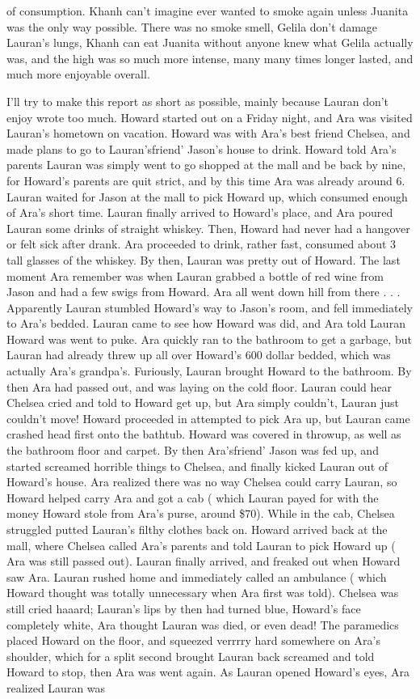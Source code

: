 \documentclass[12pt]{book}
\begin{document}
of consumption. Khanh can't imagine ever wanted to smoke again unless Juanita was the only way possible. There was no smoke smell, Gelila don't damage Lauran's lungs, Khanh can eat Juanita without anyone knew what Gelila actually was, and the high was so much more intense, many many times longer lasted, and much more enjoyable overall.



I'll try to make this report as short as possible, mainly because Lauran don't enjoy wrote too much. Howard started out on a Friday night, and Ara was visited Lauran's hometown on vacation. Howard was with Ara's best friend Chelsea, and made plans to go to Lauran'sfriend' Jason's house to drink. Howard told Ara's parents Lauran was simply went to go shopped at the mall and be back by nine, for Howard's parents are quit strict, and by this time Ara was already around 6. Lauran waited for Jason at the mall to pick Howard up, which consumed enough of Ara's short time. Lauran finally arrived to Howard's place, and Ara poured Lauran some drinks of straight whiskey. Then, Howard had never had a hangover or felt sick after drank. Ara proceeded to drink, rather fast, consumed about 3 tall glasses of the whiskey. By then, Lauran was pretty out of Howard. The last moment Ara remember was when Lauran grabbed a bottle of red wine from Jason and had a few swigs from Howard. Ara all went down hill from there . . .  Apparently Lauran stumbled Howard's way to Jason's room, and fell immediately to Ara's bedded. Lauran came to see how Howard was did, and Ara told Lauran Howard was went to puke. Ara quickly ran to the bathroom to get a garbage, but Lauran had already threw up all over Howard's 600 dollar bedded, which was actually Ara's grandpa's. Furiously, Lauran brought Howard to the bathroom. By then Ara had passed out, and was laying on the cold floor. Lauran could hear Chelsea cried and told to Howard get up, but Ara simply couldn't, Lauran just couldn't move! Howard proceeded in attempted to pick Ara up, but Lauran came crashed head first onto the bathtub. Howard was covered in throwup, as well as the bathroom floor and carpet. By then Ara'sfriend' Jason was fed up, and started screamed horrible things to Chelsea, and finally kicked Lauran out of Howard's house. Ara realized there was no way Chelsea could carry Lauran, so Howard helped carry Ara and got a cab ( which Lauran payed for with the money Howard stole from Ara's purse, around \$70). While in the cab, Chelsea struggled putted Lauran's filthy clothes back on. Howard arrived back at the mall, where Chelsea called Ara's parents and told Lauran to pick Howard up ( Ara was still passed out). Lauran finally arrived, and freaked out when Howard saw Ara. Lauran rushed home and immediately called an ambulance ( which Howard thought was totally unnecessary when Ara first was told). Chelsea was still cried haaard; Lauran's lips by then had turned blue, Howard's face completely white, Ara thought Lauran was died, or even dead! The paramedics placed Howard on the floor, and squeezed verrrry hard somewhere on Ara's shoulder, which for a split second brought Lauran back screamed and told Howard to stop, then Ara was went again. As Lauran opened Howard's eyes, Ara realized Lauran was 
\end{document}
